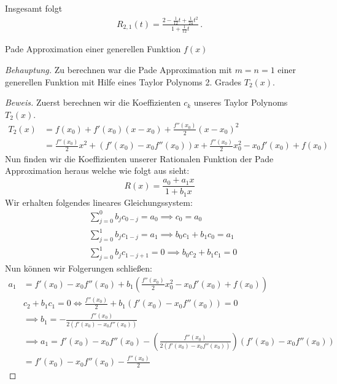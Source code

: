 \documentclass[a4paper]{article}
\newcommand{\beh}{\textit{Behauptung. }}
\newenvironment{Aufgabe}[2][Aufgabe]{\begin{trivlist}
\item[\hskip \labelsep {\bfseries #1}\hskip \labelsep {\bfseries #2.}]}{\end{trivlist}}
\begin{document}
    Insgesamt folgt
    \begin{align*}
      R_{2,1}(t) = \frac{2 - \frac{1}{12}t + \frac{1}{24}t^2}{1 + \frac{1}{12}t}\,.
    \end{align*}

\begin{theorem} %
\begin{Aufgabe}{5} %
	Pade Approximation einer generellen Funktion $f(x)$ 
\end{Aufgabe}

\beh Zu berechnen war die Pade Approximation mit $m=n=1$ einer generellen
Funktion mit Hilfe eines Taylor Polynoms 2. Grades $T_2(x)$.

\begin{proof}[Beweis]
	Zuerst berechnen wir die Koeffizienten $c_k$ unseres Taylor Polynoms $T_2(x)$.
	\begin{align*}
		T_2(x) &= f(x_0) + f' (x_0)(x-x_0) + \frac{ f'' (x_0) }{ 2 }(x-x_0) ^2 \\
			   &= \frac{ f''(x_0) }{ 2 }x ^2
			   + (f'(x_0) - x_0 f''(x_0)) x
			   + \frac{ f ''(x_0) }{ 2 }x_0 ^2 - x_0 f'(x_0) + f(x_0)
	\end{align*}
	Nun finden wir die Koeffizienten unserer Rationalen Funktion der Pade Approximation
	heraus welche wie folgt aus sieht:
	\[
		R(x) = \frac{ a_0 + a_1 x }{ 1 + b_1 x }
	\]
	Wir erhalten folgendes lineares Gleichungssystem:
	\begin{align}
		&\sum_{j=0}^{0} b_j c_{0-j} = a_0 \implies
		c_0 = a_0 \\
		&\sum_{j=0}^{1} b_{j} c_{1-j} = a_1 \implies
		b_0 c_1 + b_1 c_0 = a_1 \\
		&\sum_{j=0}^{1} b_{j} c_{1-j+1} = 0 \implies
		b_0 c_2 + b_1 c_1 = 0
	\end{align}
	Nun können wir Folgerungen schließen:
	\begin{align*}
		a_1 &= f'(x_0) - x_0 f''(x_0) + b_1 \left(
			\frac{ f ''(x_0) }{ 2 } x_0 ^2 - x_0 f'(x_0) + f(x_0)
		\right) \\
			&c_2 + b_1 c_1 = 0 \Leftrightarrow 
			\frac{ f ''(x_0) }{ 2 } + b_1 \left(
				f' (x_0) - x_0 f ''(x_0)
			\right) = 0 \\
			& \implies b_1 = 
			- \frac{ f ''(x_0) }{ 2 \left(
					f' (x_0) - x_0 f ''(x_0)
			\right) } \\
			& \implies a_1 = 
			f' (x_0) - x_0 f ''(x_0) - \left(
				\frac{ f ''(x_0) }{ 2 (f'(x_0) - x_0 f ''(x_0) ) }
			\right) ( f'(x_0) - x_0 f ''(x_0) ) \\
			&= f'(x_0) - x_0 f ''(x_0) - \frac{ f ''(x_0) }{ 2 }
	\end{align*}
\end{proof}
\end{theorem}
\end{document}
